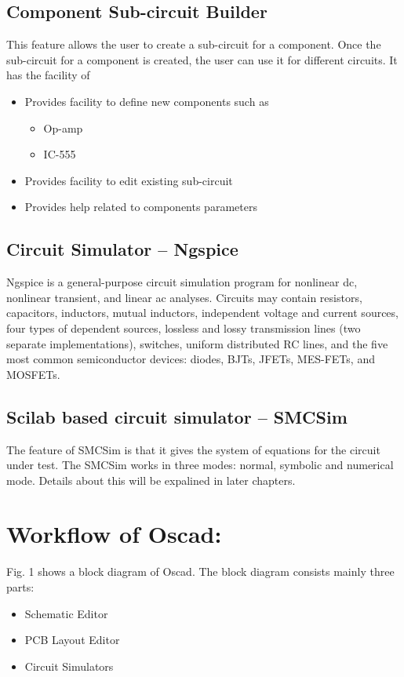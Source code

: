 \subsection{Component Sub-circuit Builder}
This feature allows the user to create a sub-circuit for a component. Once the sub-circuit for a component is created, the user can use it
for different circuits. It has the facility of 
\begin{itemize}
\item Provides facility to define new components such as
\begin{itemize}
\item Op-amp
\item IC-555
\end{itemize}
\item Provides facility to edit existing sub-circuit
\item Provides help related to components parameters
\end{itemize}

\subsection{Circuit Simulator -- Ngspice}
Ngspice is a general-purpose circuit simulation program for nonlinear dc, nonlinear transient, and linear ac analyses. Circuits may contain resistors, capacitors, inductors, mutual inductors, independent voltage and current sources, four types of dependent sources, lossless and lossy transmission lines (two separate implementations), switches, uniform distributed RC lines, and the five most common semiconductor devices: diodes, BJTs, JFETs, MES-FETs, and MOSFETs.
\subsection{Scilab based circuit simulator -- SMCSim}

The feature of SMCSim is that it gives the system of equations for the circuit under test. The SMCSim works in three modes: normal, symbolic and numerical mode. Details about this will be expalined in later chapters.

\section {Workflow of Oscad:}
Fig. 1 shows a block diagram of Oscad\cite{yogesh-paper}. The block diagram consists mainly three parts: 
\begin{itemize}
\item Schematic Editor 
\item PCB Layout Editor  
\item Circuit Simulators
\end{itemize} 


